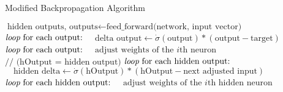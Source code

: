 \def\BState{\State\hskip-\ALG@thistlm}
\begin{algorithm}
\caption{Modified Backpropagation Algorithm}\label{euclid}
\begin{algorithmic}[1]
\State $\text{hidden outputs, outputs}\gets\text{feed\_forward(network, input vector)}$
\State $\emph{loop}\text{ for each output:}$
\State $\enspace\enspace\text{delta output}\gets\dot \sigma(\text{output})*(\text{output}-\text{target})$
\State $\emph{loop}\text{ for each output:}$
\State $\enspace\enspace\text{adjust weights of the }i\text{th neuron}$
\State $\text{// (hOutput = hidden output)}$
\State $\emph{loop}\text{ for each hidden output:}$
\State $\enspace\enspace\text{hidden delta}\gets\dot \sigma(\text{hOutput})*(\text{hOutput}-\text{next adjusted input})$
\State $\emph{loop}\text{ for each hidden output:}$
\State $\enspace\enspace\text{adjust weights of the }i\text{th hidden neuron}$
\EndProcedure
\end{algorithmic}
\end{algorithm}